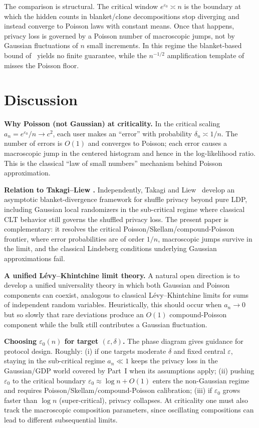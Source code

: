 \documentclass{article}
\begin{document}
\medskip

The comparison is structural. The critical window $e^{\varepsilon_0}\asymp n$ is the boundary
at which the hidden counts in blanket/clone decompositions stop diverging and instead converge
to Poisson laws with constant means. Once that happens, privacy loss is governed by a Poisson
number of macroscopic jumps, not by Gaussian fluctuations of $n$ small increments. In this
regime the blanket-based bound of~\cite{BBG19} yields no finite guarantee, while the $n^{-1/2}$
amplification template of~\cite{FMT21} misses the Poisson floor.


\section{Discussion}

\begin{tcolorbox}[keybox]
\textbf{Why Poisson (not Gaussian) at criticality.} In the critical scaling $a_n = e^{\varepsilon_0}/n \to c^2$, each user makes an ``error'' with probability $\delta_n \asymp 1/n$. The number of errors is $O(1)$ and converges to Poisson; each error causes a macroscopic jump in the centered histogram and hence in the log-likelihood ratio. This is the classical ``law of small numbers'' mechanism behind Poisson approximation.

\textbf{Relation to Takagi--Liew \cite{TL26}.} Independently, Takagi and Liew~\cite{TL26} develop an asymptotic blanket-divergence framework for shuffle privacy beyond pure LDP, including Gaussian local randomizers in the sub-critical regime where classical CLT behavior still governs the shuffled privacy loss. The present paper is complementary: it resolves the critical Poisson/Skellam/compound-Poisson frontier, where error probabilities are of order $1/n$, macroscopic jumps survive in the limit, and the classical Lindeberg conditions underlying Gaussian approximations fail.

\textbf{A unified L\'{e}vy--Khintchine limit theory.} A natural open direction is to develop a unified universality theory in which both Gaussian and Poisson components can coexist, analogous to classical L\'{e}vy--Khintchine limits for sums of independent random variables. Heuristically, this should occur when $a_n \to 0$ but so slowly that rare deviations produce an $O(1)$ compound-Poisson component while the bulk still contributes a Gaussian fluctuation.

\textbf{Choosing $\varepsilon_0(n)$ for target $(\varepsilon, \delta)$.} The phase diagram gives guidance for protocol design. Roughly: (i) if one targets moderate $\delta$ and fixed central $\varepsilon$, staying in the sub-critical regime $a_n \ll 1$ keeps the privacy loss in the Gaussian/GDP world covered by Part~I when its assumptions apply; (ii) pushing $\varepsilon_0$ to the critical boundary $\varepsilon_0 \approx \log n + O(1)$ enters the non-Gaussian regime and requires Poisson/Skellam/compound-Poisson calibration; (iii) if $\varepsilon_0$ grows faster than $\log n$ (super-critical), privacy collapses. At criticality one must also track the macroscopic composition parameters, since oscillating compositions can lead to different subsequential limits.
\end{tcolorbox}
\end{document}
